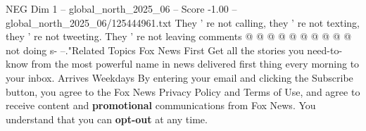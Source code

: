 \begin{textsample}{NEG Dim 1 – global\_north\_2025\_06 – Score -1.00 – global\_north\_2025\_06/125444961.txt}
They ' re not calling, they ' re not texting, they ' re not tweeting.
They ' re not leaving comments @ @ @ @ @ @ @ @ @ @ not doing s- --."Related Topics Fox News First Get all the stories you need-to-know from the most powerful name in news delivered first thing every morning to your inbox.
Arrives Weekdays By entering your email and clicking the Subscribe button, you agree to the Fox News Privacy Policy and Terms of Use, and agree to receive content and \textbf{promotional} communications from Fox News.
You understand that you can \textbf{opt-out} at any time.

\end{textsample}
